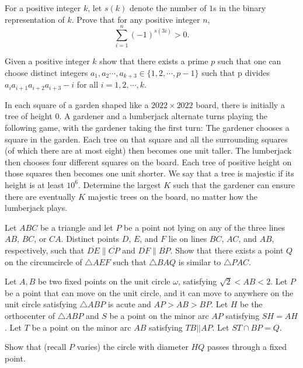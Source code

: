 \documentclass[11pt]{scrartcl}
\begin{document}
\begin{problem}[402139377468684]
For a positive integer $k$, let $s(k)$ denote the number of $1$s in the binary representation of $k$. Prove that for any positive integer $n$,
\[\sum_{i=1}^{n}(-1)^{s(3i)} > 0.\]
\end{problem}
\begin{problem}[961350373727093]
Given a positive integer $k$ show that there exists a prime $p$ such that one can choose distinct integers $a_1,a_2\cdots, a_{k+3} \in \{1, 2, \cdots ,p-1\}$ such that p divides $a_ia_{i+1}a_{i+2}a_{i+3}-i$ for all $i= 1, 2, \cdots, k$.
\end{problem}
\begin{problem}[8799177804774743019]
In each square of a garden shaped like a $2022 \times 2022$ board, there is initially a tree of height $0$. A gardener and a lumberjack alternate turns playing the following game, with the gardener taking the first turn:
The gardener chooses a square in the garden. Each tree on that square and all the surrounding squares (of which there are at most eight) then becomes one unit taller.
The lumberjack then chooses four different squares on the board. Each tree of positive height on those squares then becomes one unit shorter.
We say that a tree is majestic if its height is at least $10^6$. Determine the largest $K$ such that the gardener can ensure there are eventually $K$ majestic trees on the board, no matter how the lumberjack plays.
\end{problem}
\begin{problem}[7203789790519658258]
Let $ABC$ be a triangle and let $P$ be a point not lying on any of the three lines $AB$, $BC$, or $CA$. Distinct points $D$, $E$, and $F$ lie on lines $BC$, $AC$, and $AB$, respectively, such that $\overline{DE}\parallel \overline{CP}$ and $\overline{DF}\parallel \overline{BP}$. Show that there exists a point $Q$ on the circumcircle of $\triangle AEF$ such that $\triangle BAQ$ is similar to $\triangle PAC$.
\end{problem}
\begin{problem}[308110166188097]
Let $A,B$ be two fixed points on the unit circle $\omega$, satisfying $\sqrt{2} < AB < 2$. Let $P$ be a point that can move on the unit circle, and it can move to anywhere on the unit circle satisfying $\triangle ABP$ is acute and $AP>AB>BP$. Let $H$ be the orthocenter of $\triangle ABP$ and $S$ be a point on the minor arc $AP$ satisfying $SH=AH$. Let $T$ be a point on the minor arc $AB$ satisfying $TB || AP$. Let $ST\cap BP = Q$.

Show that (recall $P$ varies) the circle with diameter $HQ$ passes through a fixed point.
\end{problem}
\end{document}
